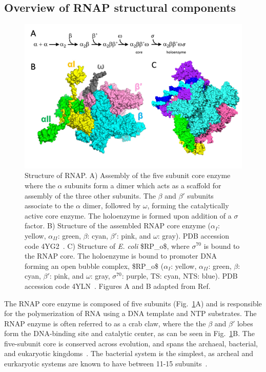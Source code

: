 \subsection{Overview of RNAP structural components}
\label{sec:RNAP_structure}

\begin{figure}
    \centering
    \includegraphics[width=\textwidth]{chapters/figures/RNAP_structure.jpg}
    \caption{\label{fig:RNAP_structure} Structure of RNAP. 
    A) Assembly of the five subunit core enzyme where the $\alpha$ subunits form a dimer which acts as a scaffold for assembly of the three other subunits. 
    The $\beta$ and $\beta'$ subunits associate to the $\alpha$ dimer, followed by $\omega$, forming the catalytically active core enzyme.
    The holoenzyme is formed upon addition of a $\sigma$ factor.
    B) Structure of the assembled RNAP core enzyme ($\alpha_I$: yellow, $\alpha_{II}$: green, $\beta$: cyan, $\beta'$: pink, and $\omega$: gray). 
    \ac{PDB} accession code 4YG2~\cite{murakami_JBC_2013}.
    C) Structure of \textit{\ac{E. coli}} \ac{$RP_o$}, where $\sigma^{70}$ is bound to the RNAP core.
    The holoenzyme is bound to promoter DNA forming an open bubble complex, \ac{$RP_o$} ($\alpha_I$: yellow, $\alpha_{II}$: green, $\beta$: cyan, $\beta'$: pink, and $\omega$: gray, $\sigma^{70}$: purple, \ac{TS}: cyan, \ac{NTS}: blue).
    \ac{PDB} accession code 4YLN~\cite{zuo_steitz_2015}.
    Figures A and B adapted from Ref.~\cite{sutherland_2018}}
\end{figure}

The RNAP core enzyme is composed of five subunits (Fig.~\ref{fig:RNAP_structure}A) and is responsible for the polymerization of RNA using a DNA template and \ac{NTP} substrates.
The RNAP enzyme is often referred to as a crab claw, where the the $\beta$ and $\beta'$ lobes form the DNA-binding site and catalytic center, as can be seen in Fig.~\ref{fig:RNAP_structure}B.
The five-subunit core is conserved across evolution, and spans the archaeal, bacterial, and eukaryotic kingdoms~\cite{murakami_JBC_2013}.
The bacterial system is the simplest, as archeal and eurkaryotic systems are known to have between 11-15 subunits~\cite{werner_2011}. 

